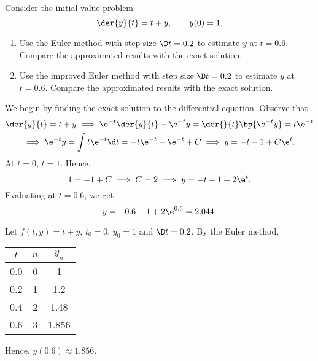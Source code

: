 \begin{problem}
    Consider the initial value problem \[\der{y}{t} = t + y, \qquad y(0) = 1.\]
    \begin{enumerate}
        \item Use the Euler method with step size $\D t = 0.2$ to estimate $y$ at $t = 0.6$. Compare the approximated results with the exact solution.
        \item Use the improved Euler method with step size $\D t = 0.2$ to estimate $y$ at $t = 0.6$. Compare the approximated results with the exact solution.
    \end{enumerate}
\end{problem}
\begin{solution}
    We begin by finding the exact solution to the differential equation. Observe that
    \begin{gather*}
        \der{y}{t} = t + y \implies \e^{-t} \der{y}{t} - \e^{-t}y = \der{}{t} \bp{\e^{-t}y} = t\e^{-t}\\
        \implies \e^{-t} y = \int t\e^{-t} \d t = -t\e^{-t} - \e^{-t} + C \implies y = -t - 1 + C\e^t.
    \end{gather*}
    At $t = 0$, $t = 1$. Hence, \[1 = -1 + C \implies C = 2 \implies y = -t - 1 + 2\e^t.\] Evaluating at $t = 0.6$, we get \[y = -0.6 - 1 + 2\e^{0.6} = 2.044.\]

    \begin{ppart}
        Let $f(t, y) = t + y$, $t_0 = 0$, $y_0 = 1$ and $\D t = 0.2$. By the Euler method,

        \begin{center}
            \begin{tabular}{|c|c|c|}
                \hline
                $t$ & $n$ & $y_n$ \\ \hline\hline
                0.0 & 0 & 1 \\ \hline
                0.2 & 1 & 1.2 \\ \hline
                0.4 & 2 & 1.48 \\ \hline
                0.6 & 3 & 1.856 \\ \hline
            \end{tabular}
        \end{center}

        Hence, $y(0.6) \approx 1.856$.


\end{ppart}
\end{solution}

